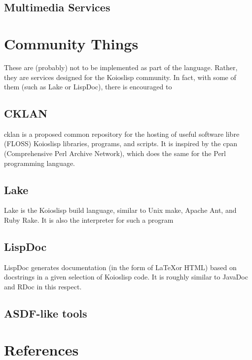 \documentclass[10pt]{book}
\begin{document}
\section{Multimedia Services}
\chapter{Community Things}
These are (probably) not to be implemented as part of the language. Rather, they are services designed for the Koioslisp community. In fact, with some of them (such as Lake or LispDoc), there is encouraged to 
\section{CKLAN} 
{\sc cklan} is a proposed common repository for the hosting of useful software libre (FLOSS) {\sc Koioslisp} libraries, programs, and scripts. It is inspired by the {\sc cpan} (Comprehensive Perl Archive Network), which does the same for the Perl programming language.
\section{Lake}
Lake is the Koioslisp build language, similar to Unix make, Apache Ant, and Ruby Rake. It is also the interpreter for such a program
\section{LispDoc}
LispDoc generates documentation (in the form of \LaTeX or HTML) based on docstrings in a given selection of Koioslisp code. It is roughly similar to JavaDoc and RDoc in this respect.
\section{ASDF-like tools} 
\chapter{References} 


\printindex
\end{document}
